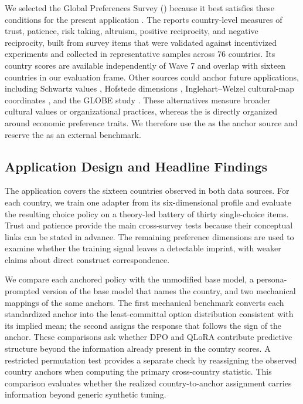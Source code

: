 We selected the Global Preferences Survey (\GPS) because it best satisfies these conditions for the present application \cite{falk2018}. The \GPS{} reports country-level measures of trust, patience, risk taking, altruism, positive reciprocity, and negative reciprocity, built from survey items that were validated against incentivized experiments and collected in representative samples across 76 countries. Its country scores are available independently of \WVS{} Wave 7 and overlap with sixteen countries in our evaluation frame. Other sources could anchor future applications, including Schwartz values \cite{schwartz1992}, Hofstede dimensions \cite{hofstede2010}, Inglehart--Welzel cultural-map coordinates \cite{inglehart2005}, and the GLOBE study \cite{globe2004}. These alternatives measure broader cultural values or organizational practices, whereas the \GPS{} is directly organized around economic preference traits. We therefore use the \GPS{} as the anchor source and reserve the \WVS{} as an external benchmark.

\subsection{Application Design and Headline Findings}\label{sec:application_design}
The application covers the sixteen countries observed in both data sources. For each country, we train one adapter from its six-dimensional \GPS{} profile and evaluate the resulting choice policy on a theory-led battery of thirty single-choice \WVS{} items. Trust and patience provide the main cross-survey tests because their conceptual links can be stated in advance. The remaining preference dimensions are used to examine whether the training signal leaves a detectable imprint, with weaker claims about direct construct correspondence.

We compare each anchored policy with the unmodified base model, a persona-prompted version of the base model that names the country, and two mechanical mappings of the same anchors. The first mechanical benchmark converts each standardized anchor into the least-committal option distribution consistent with its implied mean; the second assigns the response that follows the sign of the anchor. These comparisons ask whether DPO and QLoRA contribute predictive structure beyond the information already present in the country scores. A restricted permutation test provides a separate check by reassigning the observed country anchors when computing the primary cross-country statistic. This comparison evaluates whether the realized country-to-anchor assignment carries information beyond generic synthetic tuning.

